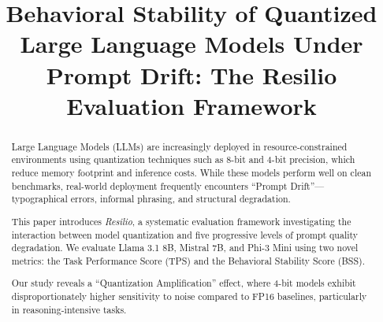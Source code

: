 \documentclass[conference]{IEEEtran}
\begin{document}
\title{Behavioral Stability of Quantized Large Language Models Under Prompt Drift: The Resilio Evaluation Framework}

\author{
\and
{}
\and
{}
\and
{}
}

\maketitle

\begin{abstract}
Large Language Models (LLMs) are increasingly deployed in resource-constrained environments using quantization techniques such as 8-bit and 4-bit precision, which reduce memory footprint and inference costs. While these models perform well on clean benchmarks, real-world deployment frequently encounters ``Prompt Drift''—typographical errors, informal phrasing, and structural degradation.

This paper introduces \textit{Resilio}, a systematic evaluation framework investigating the interaction between model quantization and five progressive levels of prompt quality degradation. We evaluate Llama 3.1 8B, Mistral 7B, and Phi-3 Mini using two novel metrics: the Task Performance Score (TPS) and the Behavioral Stability Score (BSS).

Our study reveals a ``Quantization Amplification'' effect, where 4-bit models exhibit disproportionately higher sensitivity to noise compared to FP16 baselines, particularly in reasoning-intensive tasks.
\end{abstract}
\end{document}
